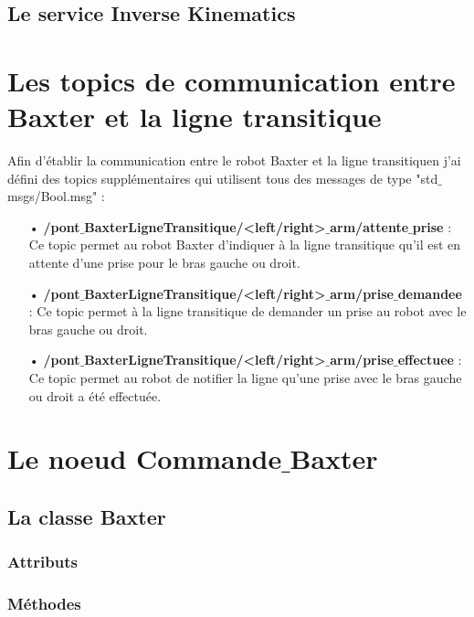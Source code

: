\documentclass[a4paper,french, titlepage]{book}
\begin{document}
\subsection{Le service Inverse Kinematics}

\newpage
\section{Les topics de communication entre Baxter et la ligne transitique}

Afin d'établir la communication entre le robot Baxter et la ligne transitiquen j'ai défini des topics supplémentaires qui utilisent tous des messages de type "std$\_$msgs/Bool.msg" :

\begin{itemize}
\item[ ] 
\item[•] \textbf{/pont$\_$BaxterLigneTransitique/<left/right>$\_$arm/attente$\_$prise} : Ce topic permet au robot Baxter d'indiquer à la ligne transitique qu'il est en attente d'une prise pour le bras gauche ou droit.
\item[ ]
\item[•] \textbf{/pont$\_$BaxterLigneTransitique/<left/right>$\_$arm/prise$\_$demandee} : Ce topic permet à la ligne transitique de demander un prise au robot avec le bras gauche ou droit.
\item[ ]
\item[•] \textbf{/pont$\_$BaxterLigneTransitique/<left/right>$\_$arm/prise$\_$effectuee} : Ce topic permet au robot de notifier la ligne qu'une prise avec le bras gauche ou droit a été effectuée.
\item[ ]
\end{itemize}



\section{Le noeud Commande$\_$Baxter}

\subsection{La classe Baxter}

\subsubsection{Attributs}

\subsubsection{Méthodes}
\end{document}
